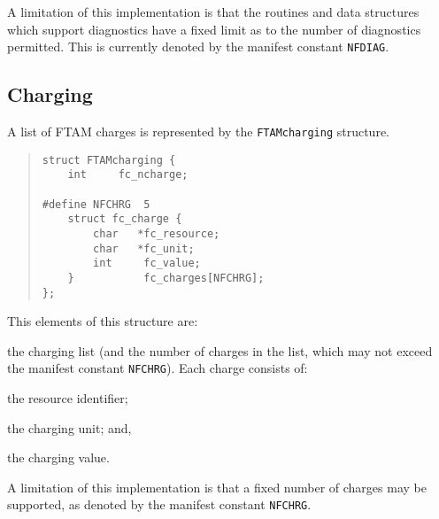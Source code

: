 A limitation of this implementation
is that the routines and data structures which support diagnostics have a
fixed limit as to the number of diagnostics permitted.
This is currently denoted by the manifest constant \verb"NFDIAG".

\subsection	{Charging}
A list of FTAM charges is represented by the \verb"FTAMcharging" structure.
\begin{quote}\small\begin{verbatim}
struct FTAMcharging {
    int     fc_ncharge;

#define NFCHRG  5
    struct fc_charge {
        char   *fc_resource;
        char   *fc_unit;
        int     fc_value;
    }           fc_charges[NFCHRG];
};
\end{verbatim}\end{quote}
This elements of this structure are:
\begin{describe}
\item[\verb"fc\_charges"/\verb"fc\_ncharge":] the charging list
(and the number of charges in the list, which may not exceed
the manifest constant \verb"NFCHRG").
Each charge consists of:
    \begin{describe}
    \item[\verb"fc\_resource":] the resource identifier;

    \item[\verb"fc\_unit":] the charging unit;
	and,

    \item[\verb"fc\_value":] the charging value.
    \end{describe}
\end{describe}
A limitation of this implementation
is that a fixed number of charges may be supported,
as denoted by the manifest constant \verb"NFCHRG".

